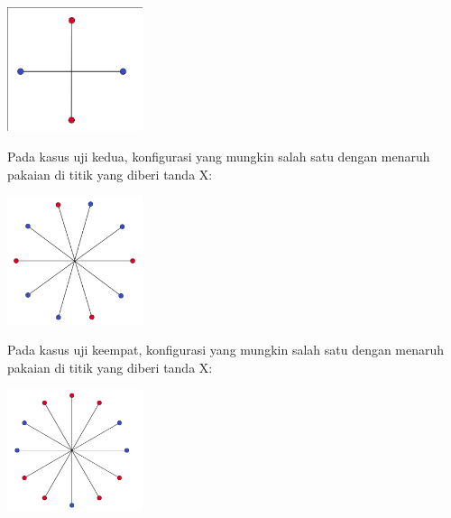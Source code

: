 \documentclass{article}
\begin{document}
\includegraphics[width=150px]{sample-1}

Pada kasus uji kedua, konfigurasi yang mungkin salah satu dengan menaruh pakaian di titik yang diberi tanda X:

\includegraphics[width=150px]{sample-2}

Pada kasus uji keempat, konfigurasi yang mungkin salah satu dengan menaruh pakaian di titik yang diberi tanda X:

\includegraphics[width=150px]{sample-4}
\end{document}
